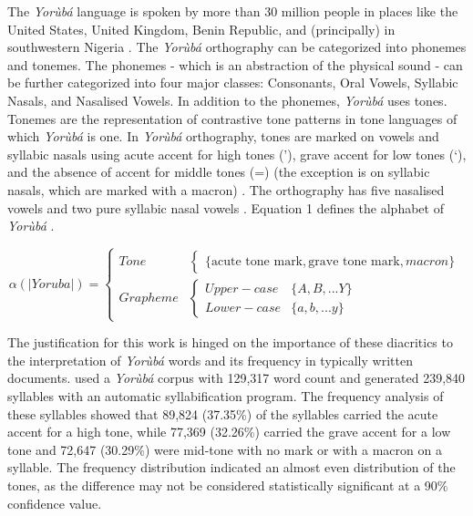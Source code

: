 \documentclass[review]{elsarticle}
\newcommand{\yor}{\textit{Yor\`ub\'a }}
\begin{document}
The \yor language is spoken by more than 30 million people in places like the United States, United Kingdom, Benin Republic, and (principally) in southwestern Nigeria \cite{asahiah2017restoring}. The \yor orthography can be categorized into phonemes and tonemes. The phonemes - which is an abstraction of the physical sound - can be further categorized into four major classes: Consonants, Oral Vowels, Syllabic Nasals, and Nasalised Vowels. In addition to the phonemes, \yor uses tones. Tonemes are the representation of contrastive tone patterns in tone languages of which \yor is one. In \yor orthography, tones are marked on vowels and syllabic nasals using acute accent for high tones (\a'{}), grave accent for low tones (\a`{}), and the absence of accent for middle tones (\a={}) (the exception is on syllabic nasals, which are marked with a macron) \cite{asahiah2017restoring}. The orthography has five nasalised vowels and two pure syllabic nasal vowels \cite{bamgbose2000grammar}. Equation 1 defines the alphabet of \yor.

\begin{equation}
\alpha(|Yoruba|) = \begin{cases}
Tone & {\begin{cases}
{\{\text{acute tone mark}, \text{grave tone mark}, macron}\}
\end{cases}} \\
Grapheme & {\begin{cases}
Upper-case & {\{A, B, ... Y\}} \\
Lower-case & {\{a, b, ... y\}} 
\end{cases}} 
\end{cases} \label{eq:torus}
\end{equation}

The justification for this work is hinged on the importance of these diacritics to the interpretation of \yor words and its frequency in typically written documents. \cite{asahiah2017restoring} used a \yor corpus with 129,317 word count and generated 239,840 syllables with an automatic syllabification program. The frequency analysis of these syllables showed that 89,824 (37.35\%) of the syllables carried the acute accent for a high tone, while 77,369 (32.26\%) carried the grave accent for a low tone and 72,647 (30.29\%) were mid-tone with no mark or with a macron on a syllable. The frequency distribution indicated an almost even distribution of the tones, as the difference may not be considered statistically significant at a 90\% confidence value.
\end{document}
